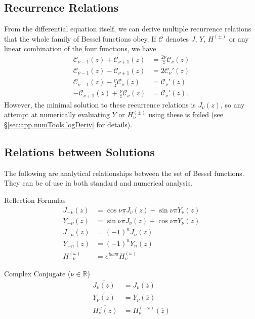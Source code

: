 \subsection{Recurrence Relations}
From the differential equation itself, we can derive multiple
recurrence relations that the whole family of Bessel functions 
obey. If $\mathcal{C}$ denotes $J$, $Y$, $H^{(\pm)}$ or any 
linear combination of the four functions, we have
  \begin{subequations}
  \begin{align}
   \mathcal{C}_{\nu-1}(z)+\mathcal{C}_{\nu+1}(z)		&= \frac{2\nu}{z}\mathcal{C}_\nu(z)	\label{eq:app.Bessel.recurrenceBessel}\\
   \mathcal{C}_{\nu-1}(z)-\mathcal{C}_{\nu+1}(z)		&= 2\mathcal{C}_\nu'(z)			\label{eq:app.Bessel.recurrenceDiffBessel}\\
   \mathcal{C}_{\nu-1}(z)-\frac{\nu}{z}\mathcal{C}_\nu(z)	&= \mathcal{C}_\nu'(z)			\\
   -\mathcal{C}_{\nu+1}(z)+\frac{\nu}{z}\mathcal{C}_\nu(z)	&= \mathcal{C}_\nu'(z).
  \end{align}
  \end{subequations}
However, the minimal solution to these recurrence relations is 
$J_\nu(z)$, so any attempt at numerically evaluating $Y$ or $H_\nu^{(\pm)}$
using these is foiled (see \S\ref{sec:app.numTools.logDeriv} for details). 

\subsection{Relations between Solutions}
The following are analytical relationships between the set of 
Bessel functions. They can be of use in both standard and numerical 
analysis. 

\begin{description}
 \item Reflection Formulas \cite[p.~286]{PRE2007}
  \begin{subequations}
  \begin{align}
   J_{-\nu}(z)	&= \cos\nu\pi J_\nu(z)-\sin\nu\pi Y_\nu(z)	\\
   Y_{-\nu}(z)	&= \sin\nu\pi J_\nu(z)+\cos\nu\pi Y_\nu(z)	\\
   J_{-n}(z)	&= (-1)^nJ_n(z)					\\
   Y_{-n}(z)	&= (-1)^nY_n(z)					\\
   H_{-\nu}^{(\omega)} &= e^{i\omega\nu\pi}H_\nu^{(\omega)}
  \end{align}
  \end{subequations}
 \item Complex Conjugate ($\nu\in\mathbb{R}$)
  \begin{subequations}
  \begin{align}
   \overline{J_\nu(z)}	&= J_\nu(\overline{z})	\\
   \overline{Y_\nu(z)}	&= Y_\nu(\overline{z})	\\
   \overline{H_\nu^{\omega}(z)} &= H_\nu^{(-\omega)}(\overline{z})\label{eq:app.Bessel.conjHankel}
  \end{align}
  \end{subequations}
\end{description}


